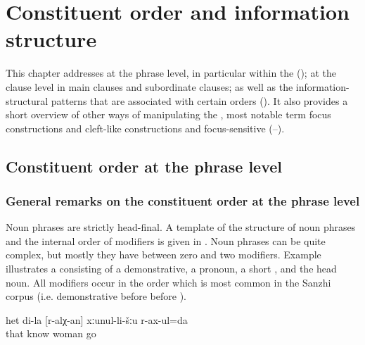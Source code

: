 \chapter{Constituent order and information structure}
\label{cpt:Constituent order and information structure}

This chapter addresses  at the phrase level, in particular within the  ();  at the clause level in main clauses and subordinate clauses; as well as the information-structural patterns that are associated with certain orders (). It also provides a short overview of other ways of manipulating the , most notable term focus constructions and cleft-like constructions and focus-sensitive  (--).



\section{Constituent order at the phrase level}
\label{sec:Constituent order at the phrase level}

\subsection{General remarks on the constituent order at the phrase level}
\label{ssec:General remarks on the constituent order at the phrase level}

Noun phrases are strictly head-final. A template of the structure of noun phrases and the internal order of modifiers is given in . Noun phrases can be quite complex, but mostly they have between zero and two modifiers. Example  illustrates a  consisting of a demonstrative, a  pronoun, a short , and the head noun. All modifiers occur in the order which is most common in the Sanzhi corpus (i.e. demonstrative before  before ).
%
\begin{exe}
	\ex	\label{ex:‎‎‎I go to my woman who I know}
	\gll	het	di-la	[r-alχ-an]	xːunul-li-šːu	r-ax-ul=da\\
		that		know	woman	go\\
	\glt	{}
\end{exe}

